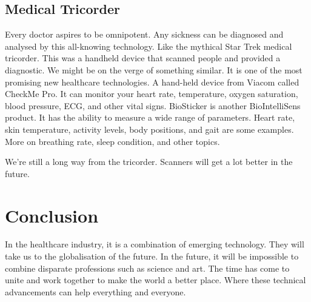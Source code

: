 \documentclass[12pt]{article}
\begin{document}
\subsection{Medical Tricorder}
Every doctor aspires to be omnipotent. Any sickness can be diagnosed and analysed by this all-knowing technology. Like the mythical Star Trek medical tricorder. This was a handheld device that scanned people and provided a diagnostic. We might be on the verge of something similar. It is one of the most promising new healthcare technologies. A hand-held device from Viacom called CheckMe Pro. It can monitor your heart rate, temperature, oxygen saturation, blood pressure, ECG, and other vital signs. BioSticker is another BioIntelliSens product. It has the ability to measure a wide range of parameters. Heart rate, skin temperature, activity levels, body positions, and gait are some examples. More on breathing rate, sleep condition, and other topics.

We're still a long way from the tricorder. Scanners will get a lot better in the future.

\section{Conclusion}
In the healthcare industry, it is a combination of emerging technology. They will take us to the globalisation of the future. In the future, it will be impossible to combine disparate professions such as science and art. The time has come to unite and work together to make the world a better place. Where these technical advancements can help everything and everyone.
\end{document}
